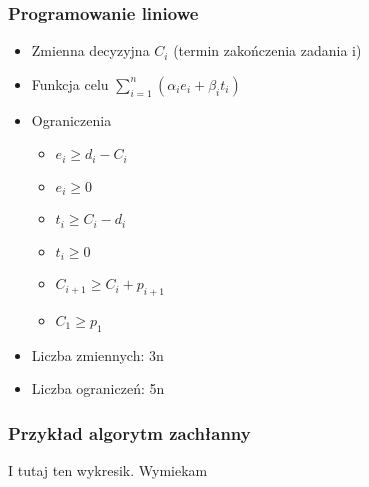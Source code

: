 \documentclass[12pt,a4paper]{article}
\begin{document}
\subsubsection{Programowanie liniowe}
\begin{itemize}
\item Zmienna decyzyjna $C_{i}$ (termin zakończenia zadania i)
\item Funkcja celu $\sum\limits_{i=1}^{n}(\alpha_{i}e_{i}+\beta_{i}t_{i})$
\item Ograniczenia
 \begin{itemize}
\item $e_{i} \geq d_{i}-C_{i}$
\item $e_{i} \geq 0$
\item $t_{i} \geq C_{i}-d_{i}$
\item $t_{i} \geq 0$
\item $C_{i+1} \geq C_{i} + p_{i+1}$
\item $C_{1} \geq p_{1}$
\end{itemize}
\item Liczba zmiennych: 3n
\item Liczba ograniczeń: 5n
\end{itemize}
\subsubsection{Przykład algorytm zachłanny}
I tutaj ten wykresik. Wymiekam
\end{document}
